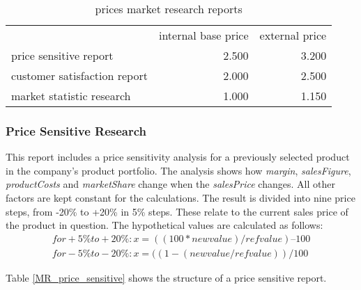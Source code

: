 \begin{table}[ht]
\centering
\begin{tabular}{|l|r|r|}
\hline
                             & internal base price  & external price \\
price sensitive report       & 2.500                & 3.200     \\
customer satisfaction report & 2.000                & 2.500     \\
market statistic research    & 1.000                & 1.150     \\
\hline
\end{tabular}
\caption{prices market research reports}
\label{MR_report_price}
\end{table}

\subsubsection{Price Sensitive Research}
This report includes a price sensitivity analysis for a previously selected product in the company's product portfolio. The analysis shows how \textit{margin}, \textit{salesFigure}, \textit{productCosts} and \textit{marketShare} change when the \textit{salesPrice} changes. All other factors are kept constant for the calculations. The result is divided into nine price steps, from -20\% to +20\% in 5\% steps. These relate to the current sales price of the product in question. The hypothetical values are calculated as follows:
\begin{equation}
    \begin{aligned}
        for +5\% to +20\%: x = ((100 * new value) / ref value) – 100 \\
        for -5\% to -20\%: x = ((1 - (new value / ref value)) / 100
    \end{aligned}
\end{equation}

Table \ref{MR_price_sensitive} shows the structure of a price sensitive report. \\

